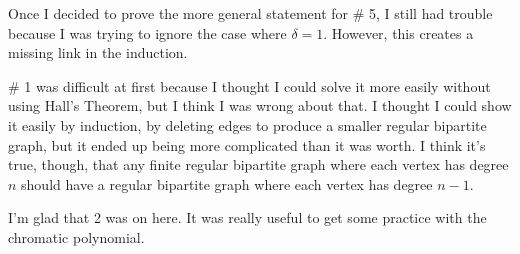 \documentclass[12pt]{article}
\begin{document}
\begin{enumerate}[leftmargin=0cm,itemindent=.5cm,labelwidth=\itemindent,labelsep=0cm,align=left]
Once I decided to prove the more general statement for \# 5, I still had trouble because I was trying to ignore the case where $\delta = 1$.  However, this creates a missing link in the induction.

\# 1 was difficult at first because I thought I could solve it more easily without using Hall's Theorem, but I think I was wrong about that.  I thought I could show it easily by induction, by deleting edges to produce a smaller regular bipartite graph, but it ended up being more complicated than it was worth.  I think it's true, though, that any finite regular bipartite graph where each vertex has degree $n$ should have a regular bipartite graph where each vertex has degree $n-1$.

I'm glad that 2 was on here.  It was really useful to get some practice with the chromatic polynomial.

\end{enumerate}
\end{document}
